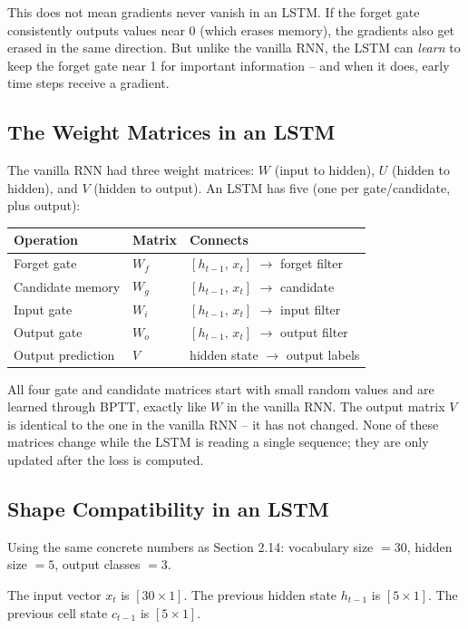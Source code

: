 This does not mean gradients never vanish in an LSTM. If the forget gate consistently
outputs values near 0 (which erases memory), the gradients also get erased in the same
direction. But unlike the vanilla RNN, the LSTM can \textit{learn} to keep the forget
gate near 1 for important information -- and when it does, early time steps receive a
gradient.

\subsection{The Weight Matrices in an LSTM}

The vanilla RNN had three weight matrices: $W$ (input to hidden), $U$ (hidden to
hidden), and $V$ (hidden to output). An LSTM has five (one per gate/candidate, plus
output):

\begin{center}
\begin{tabular}{|l|l|l|}
\hline
\textbf{Operation} & \textbf{Matrix} & \textbf{Connects} \\
\hline
Forget gate & $W_f$ & $[h_{t-1},\, x_t]$ $\to$ forget filter \\
\hline
Candidate memory & $W_g$ & $[h_{t-1},\, x_t]$ $\to$ candidate \\
\hline
Input gate & $W_i$ & $[h_{t-1},\, x_t]$ $\to$ input filter \\
\hline
Output gate & $W_o$ & $[h_{t-1},\, x_t]$ $\to$ output filter \\
\hline
Output prediction & $V$ & hidden state $\to$ output labels \\
\hline
\end{tabular}
\end{center}

All four gate and candidate matrices start with small random values and are learned
through BPTT, exactly like $W$ in the vanilla RNN. The output matrix $V$ is
identical to the one in the vanilla RNN -- it has not changed. None of these matrices
change while the LSTM is reading a single sequence; they are only updated after the
loss is computed.

\subsection{Shape Compatibility in an LSTM}

Using the same concrete numbers as Section 2.14: vocabulary size $= 30$, hidden
size $= 5$, output classes $= 3$.

The input vector $x_t$ is $[30 \times 1]$. The previous hidden state $h_{t-1}$ is
$[5 \times 1]$. The previous cell state $c_{t-1}$ is $[5 \times 1]$.

